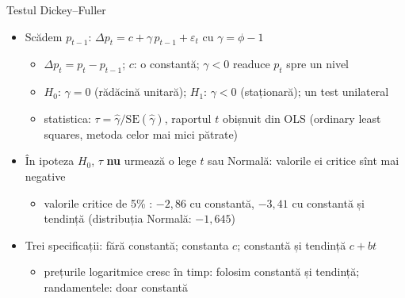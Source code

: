 \begin{frame}{Testul Dickey--Fuller}
\itemsize{\small}
\begin{itemize}
    \item Scădem $p_{t-1}$: $\Delta p_t = c + \gamma\, p_{t-1} + \varepsilon_t$ cu $\gamma = \phi - 1$ 
    \begin{itemize}
        \item $\Delta p_t = p_t - p_{t-1}$; $c$: o constantă; $\gamma < 0$ readuce $p_t$ spre un nivel
        \item $H_0$: $\gamma = 0$ (rădăcină unitară); $H_1$: $\gamma < 0$ (staționară); un test unilateral
        \item statistica: $\tau = \hat\gamma/\mathrm{SE}(\hat\gamma)$, raportul $t$ obișnuit din OLS (ordinary least squares, metoda celor mai mici pătrate)
    \end{itemize}
    \item În ipoteza $H_0$, $\tau$ \textbf{nu} urmează o lege $t$ sau Normală: valorile ei critice sînt mai negative
    \begin{itemize}
        \item valorile critice de 5\% : $-2{,}86$ cu constantă, $-3{,}41$ cu constantă și tendință (distribuția Normală: $-1{,}645$)
    \end{itemize}
    \item Trei specificații: fără constantă; constanta $c$; constantă și tendință $c + bt$
    \begin{itemize}
        \item prețurile logaritmice cresc în timp: folosim constantă și tendință; randamentele: doar constantă
    \end{itemize}
\end{itemize}
\end{frame}

